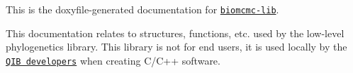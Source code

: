 This is the doxyfile-\/generated documentation for \href{https://github.com/quadram-institute-bioscience/biomcmc-lib}{\tt biomcmc-\/lib}.

This documentation relates to structures, functions, etc. used by the low-\/level phylogenetics library. This library is not for end users, it is used locally by the \href{https://github.com/quadram-institute-bioscience}{\tt Q\+IB developers} when creating C/\+C++ software. 